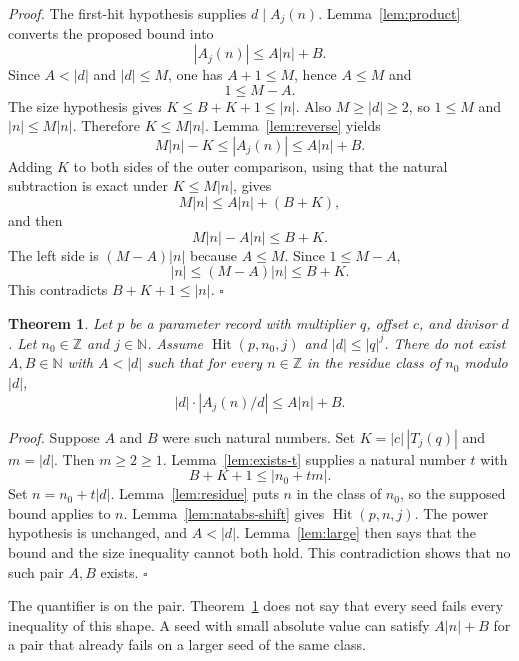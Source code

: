 \documentclass[11pt,letterpaper]{article}
\newcommand{\N}{\mathbb{N}}
\newcommand{\Z}{\mathbb{Z}}
\newtheorem{theorem}{Theorem}
\newenvironment{proof}{\noindent\textit{Proof.}}{\hfill\(\square\)}
\begin{document}
\begin{proof}
The first-hit hypothesis supplies \(d\mid A_j(n)\). Lemma~\ref{lem:product}
converts the proposed bound into
\[
|A_j(n)|\le A|n|+B.
\]
Since \(A<|d|\) and \(|d|\le M\), one has \(A+1\le M\), hence \(A\le M\) and
\[
1\le M-A.
\]
The size hypothesis gives \(K\le B+K+1\le |n|\). Also \(M\ge |d|\ge 2\), so
\(1\le M\) and \(|n|\le M|n|\). Therefore \(K\le M|n|\).
Lemma~\ref{lem:reverse} yields
\[
M|n|-K\le |A_j(n)|\le A|n|+B.
\]
Adding \(K\) to both sides of the outer comparison, using that the natural
subtraction is exact under \(K\le M|n|\), gives
\[
M|n|\le A|n|+(B+K),
\]
and then
\[
M|n|-A|n|\le B+K.
\]
The left side is \((M-A)|n|\) because \(A\le M\). Since \(1\le M-A\),
\[
|n|\le (M-A)|n|\le B+K.
\]
This contradicts \(B+K+1\le |n|\).
\end{proof}

\begin{theorem}
\label{thm:no-uniform}
Let \(p\) be a parameter record with multiplier \(q\), offset \(c\), and
divisor \(d\). Let \(n_0\in\Z\) and \(j\in\N\). Assume
\(\operatorname{Hit}(p,n_0,j)\) and \(|d|\le |q|^j\). There do not exist
\(A,B\in\N\) with \(A<|d|\) such that for every \(n\in\Z\) in the residue
class of \(n_0\) modulo \(|d|\),
\[
|d|\cdot |A_j(n)/d|\le A|n|+B.
\]
\end{theorem}

\begin{proof}
Suppose \(A\) and \(B\) were such natural numbers. Set
\(K=|c|\,|T_j(q)|\) and \(m=|d|\). Then \(m\ge 2\ge 1\).
Lemma~\ref{lem:exists-t} supplies a natural number \(t\) with
\[
B+K+1\le |n_0+tm|.
\]
Set \(n=n_0+t|d|\). Lemma~\ref{lem:residue} puts \(n\) in the class of \(n_0\),
so the supposed bound applies to \(n\). Lemma~\ref{lem:natabs-shift} gives
\(\operatorname{Hit}(p,n,j)\). The power hypothesis is unchanged, and
\(A<|d|\). Lemma~\ref{lem:large} then says that the bound and the size
inequality cannot both hold. This contradiction shows that no such pair
\(A,B\) exists.
\end{proof}

The quantifier is on the pair. Theorem~\ref{thm:no-uniform} does not say that
every seed fails every inequality of this shape. A seed with small absolute
value can satisfy \(A|n|+B\) for a pair that already fails on a larger seed of
the same class.
\end{document}
